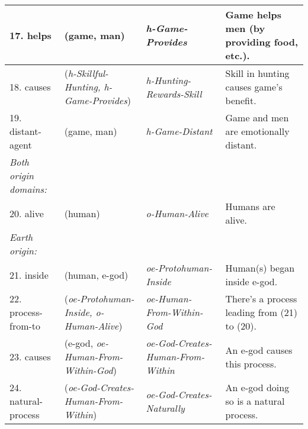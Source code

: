 \documentclass[12pt,xcolor=svgnames]{beamer}
\begin{document}
\begin{frame}
{{\begin{tabular}{llll}
\hline 17. helps &\hspace{-3ex} (game, man) &\hspace{-3ex}  \em h-Game-Provides &\hspace{-3ex} Game helps men (by providing food, etc.). \\
\hline 18. causes &\hspace{-3ex} ({\em h-Skillful-Hunting, h-Game-Provides}) &\hspace{-3ex}  \em h-Hunting-Rewards-Skill &\hspace{-3ex} Skill in hunting causes game's benefit.\\
\hline 19. distant-agent &\hspace{-3ex} (game, man) &\hspace{-3ex}  \em h-Game-Distant &\hspace{-3ex} Game and men are emotionally distant. \\
\hline\hline
\em Both origin domains: \\
\hline 
20. alive &\hspace{-3ex} (human) &\hspace{-3ex}  \em o-Human-Alive &\hspace{-3ex} Humans are alive. \\
\hline\hline
\em Earth origin: \\
\hline 21. inside &\hspace{-3ex} (human, e-god) &\hspace{-3ex}  \em oe-Protohuman-Inside &\hspace{-3ex} Human(s) began inside e-god. \\
\hline 22. process-from-to &\hspace{-3ex} ({\em oe-Protohuman-Inside, o-Human-Alive}) &\hspace{-3ex}  \em oe-Human-From-Within-God &\hspace{-3ex} There's a process leading from (21) to (20). \\
\hline 23. causes &\hspace{-3ex} (e-god, {\em oe-Human-From-Within-God}) &\hspace{-3ex}  \em oe-God-Creates-Human-From-Within &\hspace{-3ex} An e-god causes this process. \\
\hline 24. natural-process &\hspace{-3ex} ({\em oe-God-Creates-Human-From-Within}) &\hspace{-3ex}  \em oe-God-Creates-Naturally &\hspace{-3ex} An e-god doing so is a natural process. \\

\end{tabular}}}
\end{frame}
\end{document}
